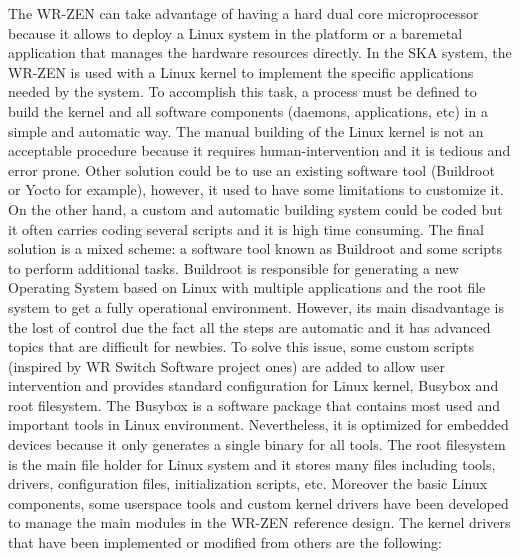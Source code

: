 \documentclass[review]{elsarticle}
\begin{document}
The WR-ZEN can take advantage of having a hard dual core microprocessor because it allows to deploy a Linux system in the platform or a baremetal application that manages the hardware resources directly. In the SKA system, the WR-ZEN is used with a Linux kernel to implement the specific applications needed by the system. To accomplish this task, a process must be defined to build the kernel and all software components (daemons, applications, etc) in a simple and automatic way. The manual building of the Linux kernel is not an acceptable procedure because it requires human-intervention and it is tedious and error prone. Other solution could be to use an existing software tool (Buildroot or Yocto for example), however, it used to have some limitations to customize it. On the other hand, a custom and automatic building system could be coded but it often carries coding several scripts and it is high time consuming. The final solution is a mixed scheme: a software tool known as Buildroot and some scripts to perform additional tasks. Buildroot is responsible for generating a new Operating System based on Linux with multiple applications and the root file system to get a fully operational environment. However, its main disadvantage is the lost of control due the fact all the steps are automatic and it has advanced topics that are difficult for newbies. To solve this issue, some custom scripts (inspired by WR Switch Software project ones) are added to allow user intervention and provides standard configuration for Linux kernel, Busybox and root filesystem. The Busybox is a software package that contains most used and important tools in Linux environment. Nevertheless, it is optimized for embedded devices because it only generates a single binary for all tools. The root filesystem is the main file holder for Linux system and it stores many files including tools, drivers, configuration files, initialization scripts, etc. Moreover the basic Linux components, some userspace tools and custom kernel drivers have been developed to manage the main modules in the WR-ZEN reference design. The kernel drivers that have been implemented or modified from others are the following:
\end{document}
